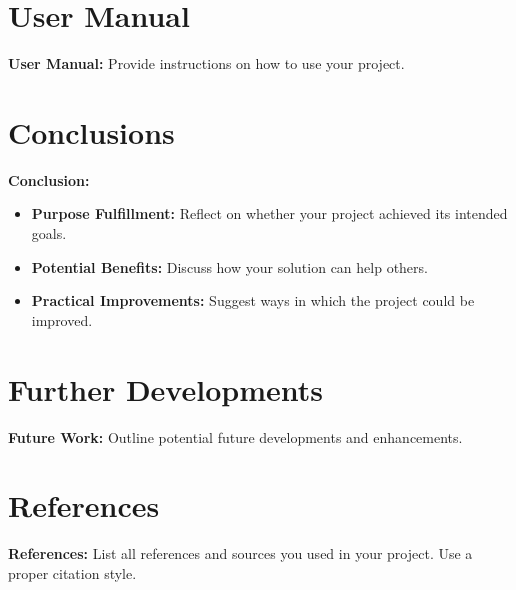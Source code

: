 \documentclass[12pt]{article}
\begin{document}
	\section{User Manual}
	\textbf{User Manual:} Provide instructions on how to use your project.
	
	\section{Conclusions}
	\textbf{Conclusion:}
	\begin{itemize}
		\item \textbf{Purpose Fulfillment:} Reflect on whether your project achieved its intended goals.
		\item \textbf{Potential Benefits:} Discuss how your solution can help others.
		\item \textbf{Practical Improvements:} Suggest ways in which the project could be improved.
	\end{itemize}
	
	\section{Further Developments}
	\textbf{Future Work:} Outline potential future developments and enhancements.
	
	\section{References}
	\textbf{References:} List all references and sources you used in your project. Use a proper citation style.
	
\end{document}
